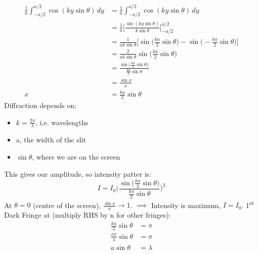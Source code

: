 \documentclass[a4paper, 11pt, normalem]{report}
\begin{document}
\begin{align}
    \frac{1}{a} \int_{-a/2}^{a/2} \cos{(ky\sin{\theta})}\,dy &= \frac{1}{a} \int_{-a/2}^{a/2} \cos{(ky\sin{\theta})}\,dy \\
                                                             &= \frac{1}{a} \Big[\frac{\sin{(ky\sin{\theta})}}{k\sin{\theta}}\Big]^{a/2}_{-a/2} \\
                                                             &= \frac{1}{ak\sin{\theta}} \Big[\sin{\Big(\frac{ka}{2}\sin{\theta}\Big)} - \sin{\Big(-\frac{ka}{2}\sin{\theta}\Big)}\Big] \\
                                                             &= \frac{2}{ak\sin{\theta}}\sin{\Big(\frac{ka}{2}\sin{\theta}\Big)} \\
                                                             &= \frac{\sin{\big(\tfrac{ka}{2}\sin{\theta}\big)}}{\tfrac{ka}{2}\sin{\theta}}\\
                                                             &= \frac{\sin{x}}{x} \\
    x &= \frac{ka}{2}\sin{\theta}
\end{align}
Diffraction depends on:
\begin{itemize}
    \item $k = \frac{2\pi}{\lambda}$, i.e. wavelengths
    \item a, the width of the slit
    \item $\sin{\theta}$, where we are on the screen
\end{itemize}
This gives our amplitude, so intensity patter is:
\begin{equation}
    I = I_{0}\Bigg(\frac{\sin{\big(\tfrac{ka}{2}\sin{\theta}\big)}}{\tfrac{ka}{2}\sin{\theta}}\Bigg)^{2}
\end{equation}
At $\theta = 0$ (centre of the screen), $\frac{\sin{x}}{x} \rightarrow 1$.
$\implies$ Intensity is maximum, $I =I_{0}$.
1\textsuperscript{st} Dark Fringe at (multiply RHS by n for other fringes):
\begin{align}
    \frac{ka}{2}\sin{\theta} &= \pi \\
    \frac{a\pi}{\lambda}\sin{\theta} &= \pi \\
    a\sin{\theta} &= \lambda
\end{align}
\end{document}
